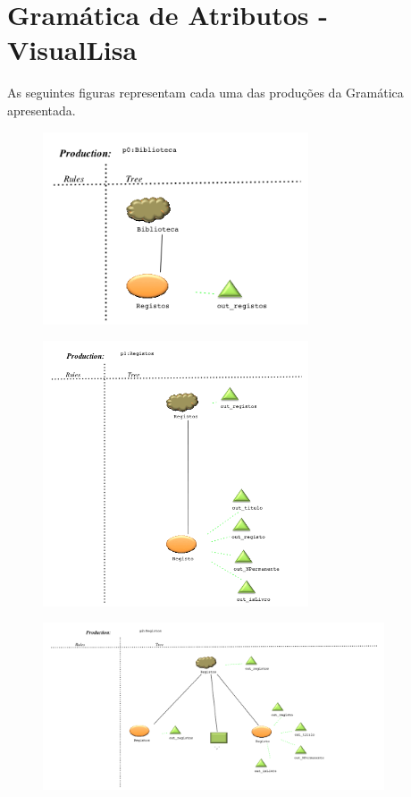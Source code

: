 \section{Gramática de Atributos - VisualLisa}
\label{sec_gramatica_atributos_visual}
As seguintes figuras representam cada uma das produções da Gramática apresentada.


\begin{figure}[!htb]
  \centering
    \includegraphics[width=0.7\textwidth]{./imagens/VisualLisa/__p0_Biblioteca.png}
\end{figure}
\begin{figure}[!htb]
  \centering
    \includegraphics[width=0.7\textwidth]{./imagens/VisualLisa/__p1_Registos.png}
\end{figure}
\begin{figure}[!htb]
  \centering
    \includegraphics[width=0.9\textwidth]{./imagens/VisualLisa/__p2_Registos.png}
\end{figure}
